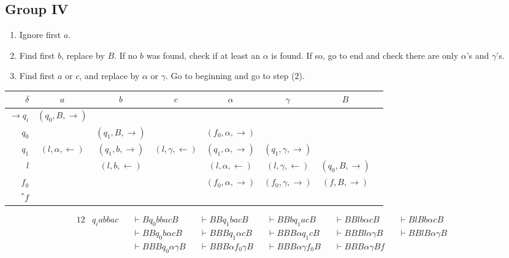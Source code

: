 \documentclass[docid=2017/18]{tcom_exam}
\begin{document}
{\subsection{Group IV}
\begin{enumerate}
	\item Ignore first $a$.
	\item Find first $b$, replace by $B$. If no $b$ was found, check if at least an $\alpha$ is found. If so, go to end and check there are only $\alpha$'s and $\gamma$'s. 
	\item Find first $a$ or $c$, and replace by $\alpha$ or $\gamma$. Go to beginning and go to step (2).
\end{enumerate}
\begin{center}
	\begin{tabular}{r | c c c c c c c }
		$\delta$          & $a$                     & $b$                   & $c$                     & $\alpha$                   & $\gamma$                   & $B$ \\ \hline
		$\rightarrow q_i$ & $(q_0,B,\rightarrow)$   &                       &                         &                            &                            &     \\
		$            q_0$ &                         & $(q_1,B,\rightarrow)$ &                         & $(f_0,\alpha,\rightarrow)$ &                            &     \\
		$            q_1$ & $(l,\alpha,\leftarrow)$ & $(q_1,b,\rightarrow)$ & $(l,\gamma,\leftarrow)$ & $(q_1,\alpha,\rightarrow)$ & $(q_1,\gamma,\rightarrow)$ &                     \\
		$            l  $ &                         & $(l  ,b,\leftarrow )$ &                         & $(l  ,\alpha,\leftarrow )$ & $(l  ,\gamma,\leftarrow )$ & $(q_0,B,\rightarrow)$ \\
		$            f_0$ &                         &                       &                         & $(f_0,\alpha,\rightarrow)$ & $(f_0,\gamma,\rightarrow)$ & $(f,B,\rightarrow)$ \\
		$         ^* f  $ &                         &                       &                         &                            &                            & 
	\end{tabular}
\end{center}
\begin{alignat*}{12}
	& q_i abbac &&\vdash B q_0 bbac       B &&\vdash BB q_1 bac       B &&\vdash BBb q_1 ac      B &&\vdash BB l b\alpha c     B &&\vdash B l Bb\alpha c B &&\\
	&           &&\vdash BB q_0 b\alpha c B &&\vdash BBB q_1 \alpha c B &&\vdash BBB\alpha q_1 c B &&\vdash BBB l \alpha\gamma B &&\vdash BB l B\alpha\gamma B &&\\
	&           &&\vdash BBB q_0 \alpha\gamma B &&\vdash BBB\alpha f_0 \gamma B &&\vdash BBB\alpha\gamma f_0 B &&\vdash BBB\alpha\gamma B f  
\end{alignat*}
\pagebreak
}
\end{document}
